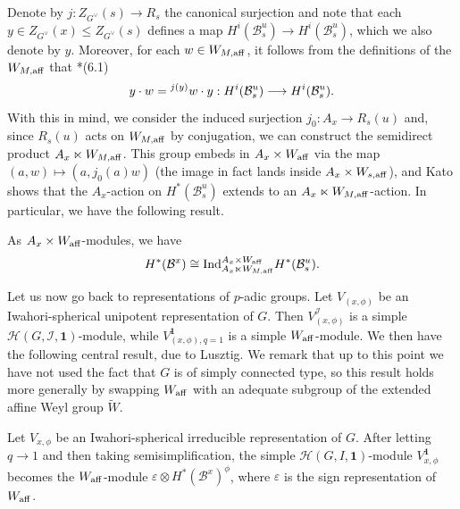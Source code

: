 Denote by $j:Z_{G^\vee}(s)\rightarrow R_s$ the canonical surjection and note that each $y\in Z_{G^\vee}(x)\leq Z_{G^\vee}(s)$ defines a map $H^i(\mathcal{B}_s^u)\rightarrow H^i(\mathcal{B}_s^u)$, which we also denote by $y$. Moreover, for each $w\in W_{M,\mathrm{aff}}$, it follows from the definitions of the $W_{M,\mathrm{aff}}$ that \cite{Kato1983}*{(6.1)}
$$y\cdot w=\prescript{j(y)}{}{w}\cdot y:H^i(\mathcal{B}_s^u)\longrightarrow H^i(\mathcal{B}_s^u).$$
With this in mind, we consider the induced surjection $j_0:A_x\rightarrow R_s(u)$ and, since $R_s(u)$ acts on $W_{M,\mathrm{aff}}$ by conjugation, we can construct the semidirect product $A_x\ltimes W_{M,\mathrm{aff}}$. This group embeds in $A_x\times W_{\mathrm{aff}}$ via the map $(a,w)\mapsto(a,j_0(a)w)$ (the image in fact lands inside $A_x\times W_{s,\mathrm{aff}}$), and Kato shows that the $A_x$-action on $H^*(\mathcal{B}_s^u)$ extends to an $A_x\ltimes W_{M,\mathrm{aff}}$-action. In particular, we have the following result.

\begin{proposition}
    As $A_x\times W_{\mathrm{aff}}$-modules, we have
    $$H^*(\mathcal{B}^x)\cong\mathrm{Ind}_{A_x\ltimes W_{M,\mathrm{aff}}}^{A_x\times W_{\mathrm{aff}}} H^*(\mathcal{B}_s^u).$$
\end{proposition}
Let us now go back to representations of $p$-adic groups. Let $V_{(x,\phi)}$ be an Iwahori-spherical unipotent representation of $G$. Then $V_{(x,\phi)}^\mathcal{I}$ is a simple $\mathcal{H}(G,\mathcal{I},\mathbf{1})$-module, while $V_{(x,\phi),q=1}^\mathbf{1}$ is a simple $W_{\mathrm{aff}}$-module. We then have the following central result, due to Lusztig. We remark that up to this point we have not used the fact that $G$ is of simply connected type, so this result holds more generally by swapping $W_{\mathrm{aff}}$ with an adequate subgroup of the extended affine Weyl group $\widetilde{W}$.

\begin{theorem}\label{thm:Kato_module}\cite{Lusztig1995b}
    Let $V_{x,\phi}$ be an Iwahori-spherical irreducible representation of $G$. After letting $q\rightarrow 1$ and then taking semisimplification, the simple $\mathcal{H}(G,I,\mathbf{1})$-module $V^\mathbf{1}_{x,\phi}$ becomes the $W_{\mathrm{aff}}$-module $\varepsilon\otimes H^*(\mathcal{B}^x)^\phi$, where $\varepsilon$ is the sign representation of $W_{\mathrm{aff}}$.
\end{theorem}

